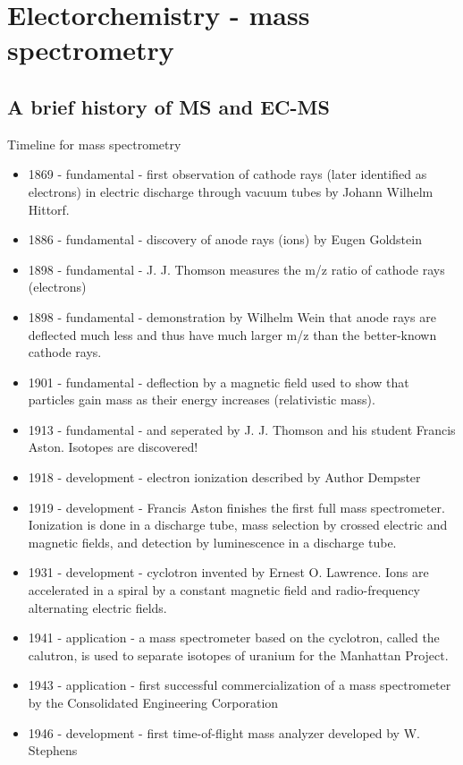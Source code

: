 \section{Electorchemistry - mass spectrometry}

\subsection{A brief history of MS and EC-MS}
Timeline for mass spectrometry

\begin{itemize}
	\item 1869 - fundamental - first observation of cathode rays (later identified as electrons) in electric discharge through vacuum tubes by Johann Wilhelm Hittorf.
	\item 1886 - fundamental - discovery of anode rays (ions) by Eugen Goldstein
	\item 1898 - fundamental - J. J. Thomson measures the m/z ratio of cathode rays (electrons)
	\item 1898 - fundamental - demonstration by Wilhelm Wein that anode rays are deflected much less and thus have much larger m/z than the better-known cathode rays.
	\item 1901 - fundamental - deflection by a magnetic field used to show that particles gain mass as their energy increases (relativistic mass).
	\item 1913 - fundamental -  and  seperated by J. J. Thomson and his student Francis Aston. Isotopes are discovered!
	\item 1918 - development - electron ionization described by Author Dempster
	\item 1919 - development - Francis Aston finishes the first full mass spectrometer. Ionization is done in a discharge tube, mass selection by crossed electric and magnetic fields, and detection by luminescence in a discharge tube.
	\item 1931 - development - cyclotron invented by Ernest O. Lawrence. Ions are accelerated in a spiral by a constant magnetic field and radio-frequency alternating electric fields.
	\item 1941 - application - a mass spectrometer based on the cyclotron, called the calutron, is used to separate isotopes of uranium for the Manhattan Project.
	\item 1943 - application - first successful commercialization of a mass spectrometer by the Consolidated Engineering Corporation
	\item 1946 - development - first time-of-flight mass analyzer developed by W. Stephens

\end{itemize}
